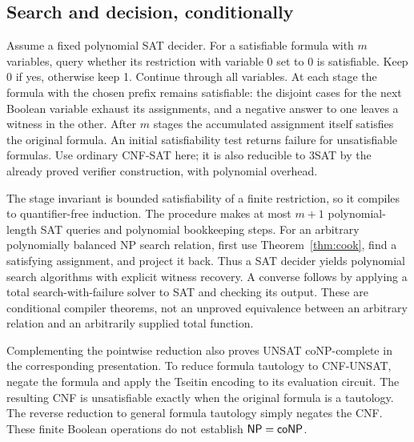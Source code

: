 \subsection{Search and decision, conditionally}

Assume a fixed polynomial SAT decider. For a satisfiable formula with
\(m\) variables, query whether its restriction with variable 0 set to 0 is
satisfiable. Keep 0 if yes, otherwise keep 1. Continue through all variables.
At each stage the formula with the chosen prefix remains satisfiable:
the disjoint cases for the next Boolean variable exhaust its assignments,
and a negative answer to one leaves a witness in the other. After \(m\)
stages the accumulated assignment itself satisfies the original formula.
An initial satisfiability test returns failure for unsatisfiable formulas.
Use ordinary CNF-SAT here; it is also reducible to 3SAT by the already
proved verifier construction, with polynomial overhead.

The stage invariant is bounded satisfiability of a finite restriction, so
it compiles to quantifier-free induction. The procedure makes at most
\(m+1\) polynomial-length SAT queries and polynomial bookkeeping steps.
For an arbitrary polynomially balanced NP search relation, first use
Theorem~\ref{thm:cook}, find a satisfying assignment, and project it back.
Thus a SAT decider yields polynomial search algorithms with explicit
witness recovery. A converse follows by applying a total search-with-failure
solver to SAT and checking its output. These are conditional compiler
theorems, not an unproved equivalence between an arbitrary relation and an
arbitrarily supplied total function.

Complementing the pointwise reduction also proves UNSAT coNP-complete in
the corresponding presentation. To reduce formula tautology to CNF-UNSAT,
negate the formula and apply the Tseitin encoding to its evaluation circuit.
The resulting CNF is unsatisfiable exactly when the original formula is a
tautology. The reverse reduction to general formula tautology simply negates
the CNF. These finite Boolean operations
do not establish \(\mathsf{NP}=\mathsf{coNP}\).
